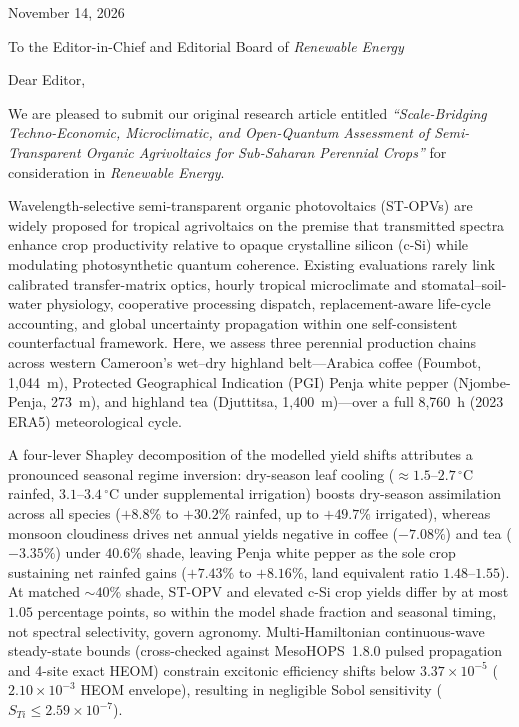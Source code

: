 \documentclass[11pt]{article}
\begin{document}
\noindent
November 14, 2026

\vspace{0.6em}
\noindent
To the Editor-in-Chief and Editorial Board of \textit{Renewable Energy}

\vspace{0.6em}
\noindent
Dear Editor,

\vspace{0.5em}
\noindent
We are pleased to submit our original research article entitled \textit{``Scale-Bridging Techno-Economic, Microclimatic, and Open-Quantum Assessment of Semi-Transparent Organic Agrivoltaics for Sub-Saharan Perennial Crops''} for consideration in \textit{Renewable Energy}.

Wavelength-selective semi-transparent organic photovoltaics (ST-OPVs) are widely proposed for tropical agrivoltaics on the premise that transmitted spectra enhance crop productivity relative to opaque crystalline silicon (c-Si) while modulating photosynthetic quantum coherence. Existing evaluations rarely link calibrated transfer-matrix optics, hourly tropical microclimate and stomatal--soil-water physiology, cooperative processing dispatch, replacement-aware life-cycle accounting, and global uncertainty propagation within one self-consistent counterfactual framework. Here, we assess three perennial production chains across western Cameroon's wet--dry highland belt---Arabica coffee (Foumbot, 1,044~m), Protected Geographical Indication (PGI) Penja white pepper (Njombe-Penja, 273~m), and highland tea (Djuttitsa, 1,400~m)---over a full 8,760~h (2023 ERA5) meteorological cycle.

A four-lever Shapley decomposition of the modelled yield shifts attributes a pronounced seasonal regime inversion: dry-season leaf cooling ($\approx 1.5$--$2.7\,^\circ\mathrm{C}$ rainfed, $3.1$--$3.4\,^\circ\mathrm{C}$ under supplemental irrigation) boosts dry-season assimilation across all species ($+8.8\%$ to $+30.2\%$ rainfed, up to $+49.7\%$ irrigated), whereas monsoon cloudiness drives net annual yields negative in coffee ($-7.08\%$) and tea ($-3.35\%$) under $40.6\%$ shade, leaving Penja white pepper as the sole crop sustaining net rainfed gains ($+7.43\%$ to $+8.16\%$, land equivalent ratio $1.48$--$1.55$). At matched $\sim 40\%$ shade, ST-OPV and elevated c-Si crop yields differ by at most $1.05$ percentage points, so within the model shade fraction and seasonal timing, not spectral selectivity, govern agronomy. Multi-Hamiltonian continuous-wave steady-state bounds (cross-checked against MesoHOPS~1.8.0 pulsed propagation and 4-site exact HEOM) constrain excitonic efficiency shifts below $3.37\times 10^{-5}$ ($2.10\times 10^{-3}$ HEOM envelope), resulting in negligible Sobol sensitivity ($S_{Ti} \le 2.59\times 10^{-7}$).
\end{document}

